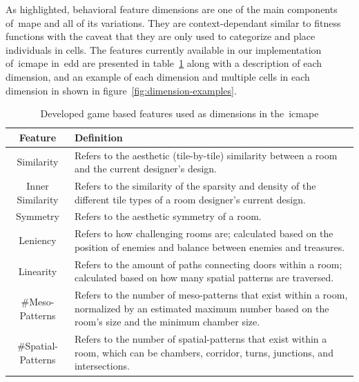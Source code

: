 As highlighted, behavioral feature dimensions are one of the main components of~\acrshort{mape} and all of its variations. They are context-dependant similar to fitness functions with the caveat that they are only used to categorize and place individuals in cells. The features currently available in our implementation of~\acrshort{icmape} in~\acrshort{edd} are presented in table~\ref{table:mape-dimensions} along with a description of each dimension, and an example of each dimension and multiple cells in each dimension in shown in figure~\ref{fig:dimension-examples}. 

\begin{table}[h]
\centering
\caption{Developed game based features used as dimensions in the~\acrlong{icmape}}\label{table:mape-dimensions}
\begin{tabularx}{\textwidth}{|c|X|}
\hline
\rule{0pt}{12pt}
Feature&Definition\\ \hline
Similarity & Refers to the aesthetic (tile-by-tile) similarity between a room and the current designer's design.\\ \hline
Inner Similarity & Refers to the similarity of the sparsity and density of the different tile types of a room designer's current design.\\ \hline
Symmetry & Refers to the aesthetic symmetry of a room.\\ \hline
Leniency & Refers to how challenging rooms are; calculated based on the position of enemies and balance between enemies and treasures.\\ \hline
Linearity & Refers to the amount of paths connecting doors within a room; calculated based on how many spatial patterns are traversed.\\ \hline
\#Meso-Patterns & Refers to the number of meso-patterns that exist within a room, normalized by an estimated maximum number based on the room's size and the minimum chamber size.\\ \hline
\#Spatial-Patterns & Refers to the number of spatial-patterns that exist within a room, which can be chambers, corridor, turns, junctions, and intersections.\\ \hline
\end{tabularx}
\end{table}



